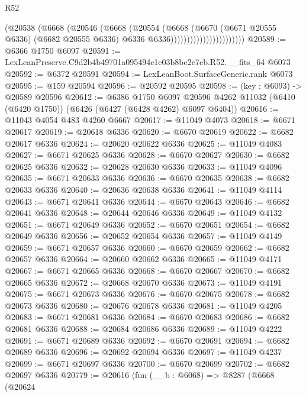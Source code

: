 \begin{lexlean}{R52}
\begin{coremodule}
                                    (@20538
                                      (@6668
                                        (@20546
                                          (@6668
                                            (@20554
                                              (@6668
                                                (@6670
                                                  (@6671 @20555 @6336)
                                                  (@6682 @20555 @6336)
                                                  @6336
                                                  @6336)))))))))))))))))))))))
@20589 := @6366 @1750 @6097
@20591 := LexLeanPreserve.C9d2b4b49701a095494c1c03b8be2e7cb.R52.__fits_64 @6073
@20592 := @6372 @20591
@20594 := LexLeanBoot.SurfaceGeneric.rank @6073
@20595 := @159 @20594
@20596 := @20592 @20595
@20598 := (key : @6093) -> @20589 @20596
@20612 := @6386
    @1750
    @6097
    @20596
    @4262
    @11032
    (@6410 (@6420 @1750))
    (@6426 (@6427 (@6428 @4262) @6097 @6404))
@20616 := @11043 @4054 @483 @4260 @6667
@20617 := @11049 @4073
@20618 := @6671 @20617
@20619 := @20618 @6336
@20620 := @6670 @20619
@20622 := @6682 @20617 @6336
@20624 := @20620 @20622 @6336
@20625 := @11049 @4083
@20627 := @6671 @20625 @6336
@20628 := @6670 @20627
@20630 := @6682 @20625 @6336
@20632 := @20628 @20630 @6336
@20633 := @11049 @4096
@20635 := @6671 @20633 @6336
@20636 := @6670 @20635
@20638 := @6682 @20633 @6336
@20640 := @20636 @20638 @6336
@20641 := @11049 @4114
@20643 := @6671 @20641 @6336
@20644 := @6670 @20643
@20646 := @6682 @20641 @6336
@20648 := @20644 @20646 @6336
@20649 := @11049 @4132
@20651 := @6671 @20649 @6336
@20652 := @6670 @20651
@20654 := @6682 @20649 @6336
@20656 := @20652 @20654 @6336
@20657 := @11049 @4149
@20659 := @6671 @20657 @6336
@20660 := @6670 @20659
@20662 := @6682 @20657 @6336
@20664 := @20660 @20662 @6336
@20665 := @11049 @4171
@20667 := @6671 @20665 @6336
@20668 := @6670 @20667
@20670 := @6682 @20665 @6336
@20672 := @20668 @20670 @6336
@20673 := @11049 @4191
@20675 := @6671 @20673 @6336
@20676 := @6670 @20675
@20678 := @6682 @20673 @6336
@20680 := @20676 @20678 @6336
@20681 := @11049 @4205
@20683 := @6671 @20681 @6336
@20684 := @6670 @20683
@20686 := @6682 @20681 @6336
@20688 := @20684 @20686 @6336
@20689 := @11049 @4222
@20691 := @6671 @20689 @6336
@20692 := @6670 @20691
@20694 := @6682 @20689 @6336
@20696 := @20692 @20694 @6336
@20697 := @11049 @4237
@20699 := @6671 @20697 @6336
@20700 := @6670 @20699
@20702 := @6682 @20697 @6336
@20779 := @20616
    (fun (__b : @6068) =>
    @8287
      (@6668
        (@20624

\end{coremodule}
\end{lexlean}
